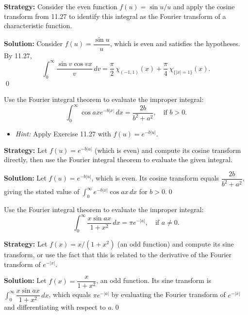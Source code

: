 \noindent\textbf{Strategy:} Consider the even function $f(u)=\sin u/u$ and apply the cosine transform from 11.27 to identify this integral as the Fourier transform of a characteristic function.

\bigskip\noindent\textbf{Solution:}
Consider $f(u)=\dfrac{\sin u}{u}$, which is even and satisfies the hypotheses. By 11.27,
\[\int_0^{\infty}\frac{\sin v\cos vx}{v}\,dv=\frac{\pi}{2}\,\chi_{(-1,1)}(x)+\frac{\pi}{4}\,\chi_{\{|x|=1\}}(x).\]\qed


\begin{problembox}
Use the Fourier integral theorem to evaluate the improper integral:
\[
\int_0^\infty \cos ax e^{-b|x|} \, dx = \frac{2b}{b^2 + a^2}, \quad \text{if } b > 0.
\]
\begin{itemize}
\item \textit{Hint:} Apply Exercise 11.27 with $f(u) = e^{-b|u|}$.
\end{itemize}
\end{problembox}

\noindent\textbf{Strategy:} Let $f(u)=e^{-b|u|}$ (which is even) and compute its cosine transform directly, then use the Fourier integral theorem to evaluate the given integral.

\bigskip\noindent\textbf{Solution:}
Let $f(u)=e^{-b|u|}$, which is even. Its cosine transform equals $\dfrac{2b}{b^2+a^2}$, giving the stated value of $\int_0^{\infty}e^{-b|x|}\cos ax\,dx$ for $b>0$.\qed


\begin{problembox}
Use the Fourier integral theorem to evaluate the improper integral:
\[
\int_0^\infty \frac{x \sin ax}{1 + x^2} \, dx = \pi e^{-|a|}, \quad \text{if } a \neq 0.
\]
\end{problembox}

\noindent\textbf{Strategy:} Let $f(x)=x/(1+x^2)$ (an odd function) and compute its sine transform, or use the fact that this is related to the derivative of the Fourier transform of $e^{-|x|}$.

\bigskip\noindent\textbf{Solution:}
Let $f(x)=\dfrac{x}{1+x^2}$, an odd function. Its sine transform is $\int_0^{\infty}\dfrac{x\sin ax}{1+x^2}\,dx$, which equals $\pi e^{-|a|}$ by evaluating the Fourier transform of $e^{-|x|}$ and differentiating with respect to $a$.\qed


